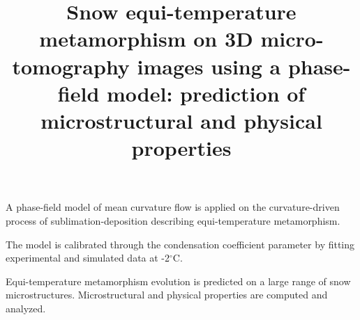 \documentclass[draft,ms]{agujournal2019}
\begin{document}
\title{Snow equi-temperature metamorphism on 3D micro-tomography images using a phase-field model: prediction of microstructural and physical properties}





\begin{keypoints}
\item A phase-field model of mean curvature flow is applied on the curvature-driven process of sublimation-deposition describing equi-temperature metamorphism.%
\item The model is calibrated through the condensation coefficient parameter by fitting experimental and simulated data at -2$^\circ$C.
\item Equi-temperature metamorphism evolution is predicted on a large range of snow microstructures. Microstructural and physical properties are computed and analyzed.
\end{keypoints}
\end{document}
